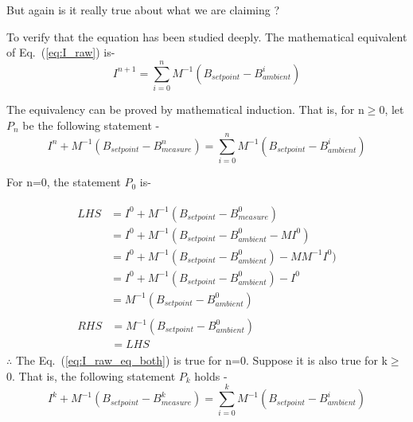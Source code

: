 

\FloatBarrier
But again is it really true about what we are claiming ?

To verify that the equation has been studied deeply. The mathematical equivalent of Eq.~(\ref{eq:I_raw}) is- 
\begin{equation}\label{eq:I_raw_eq}
    I^{n+1}= \sum_{i=0}^n M^{-1} (B_{setpoint}-B_{ambient}^i)
\end{equation}

The equivalency can be proved by mathematical induction. That is, for n$\geq$0, let $P_n$ be the following statement -
\begin{equation}\label{eq:I_raw_eq_both}
   I^n+M^{-1} (B_{setpoint}-B_{measure}^n)= \sum_{i=0}^n M^{-1} (B_{setpoint}-B_{ambient}^i)
\end{equation}

For n=0, the statement $P_0$ is-

\begin{align*}
    \begin{split}
      LHS &=I^0+M^{-1} (B_{setpoint}-B_{measure}^0) \\
        &=I^0+M^{-1} (B_{setpoint}-B_{ambient}^0 -M I^0) \\
        &=I^0+M^{-1} (B_{setpoint}-B_{ambient}^0) - MM^{-1} I^0) \\
        &=I^0+M^{-1} (B_{setpoint}-B_{ambient}^0) - I^0 \\
        &=M^{-1} (B_{setpoint}-B_{ambient}^0)
    \end{split}
    \\
    \begin{split}
      RHS &=M^{-1} (B_{setpoint}-B_{ambient}^0)\\
          &= LHS
    \end{split}
\end{align*}
$\therefore$ The Eq.~(\ref{eq:I_raw_eq_both}) is true for n=0.\newline
Suppose it is also true for k$\geq$0. That is, the following statement $P_k$ holds -
\begin{equation}\label{eq:I_raw_99}
   I^k+M^{-1} (B_{setpoint}-B_{measure}^k)= \sum_{i=0}^k M^{-1} (B_{setpoint}-B_{ambient}^i)
\end{equation}

